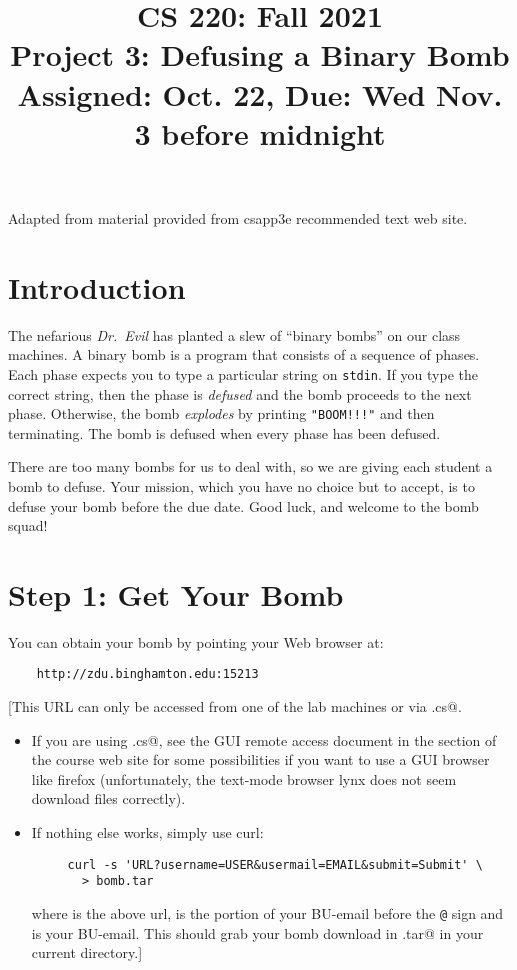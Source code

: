 \documentclass[11pt]{article}
\title{CS 220: Fall 2021\\
Project 3: Defusing a Binary Bomb\\
Assigned: Oct. 22, Due: Wed Nov. 3 before midnight\\
}
\author{}
\date{}
\begin{document}
\maketitle

Adapted from material provided from csapp3e recommended text web site.

\section{Introduction}

The nefarious {\em Dr.~Evil} has planted a slew of ``binary bombs'' on
our class machines.  A binary bomb is a program that consists of a
sequence of phases. Each phase expects you to type a particular string
on \texttt{stdin}.  If you type the correct string, then the phase is
{\em defused} and the bomb proceeds to the next phase. Otherwise, the
bomb {\em explodes} by printing \verb."BOOM!!!". and then
terminating. The bomb is defused when every phase has been defused.

There are too many bombs for us to deal with, so we are giving each
student a bomb to defuse.  Your mission, which you have no choice but to
accept, is to defuse your bomb before the due date.  Good luck, and
welcome to the bomb squad!

\section*{Step 1: Get Your Bomb}

You can obtain your bomb by pointing your Web browser at:

\begin{verbatim}
    http://zdu.binghamton.edu:15213
\end{verbatim}

[This URL can only be accessed from one of the lab machines or via \verb@remote.cs@.

\begin{itemize}
  
  \item If you are using \verb@remote.cs@, see the GUI remote access
    document in the \verb@misc@ section of the course web site for
    some possibilities if you want to use a GUI browser like firefox
    (unfortunately, the text-mode browser lynx does not seem download
    files correctly).

  \item If nothing else works, simply use curl:

    \begin{verbatim}
     curl -s 'URL?username=USER&usermail=EMAIL&submit=Submit' \
       > bomb.tar
     \end{verbatim}

    where \verb@URL@ is the above url, \verb@USER@ is the portion of
    your BU-email before the \verb/@/ sign and \verb@EMAIL@ is your
    BU-email.  This should grab your bomb download in \verb@bomb.tar@
    in your current directory.]

\end{itemize}
\end{document}
